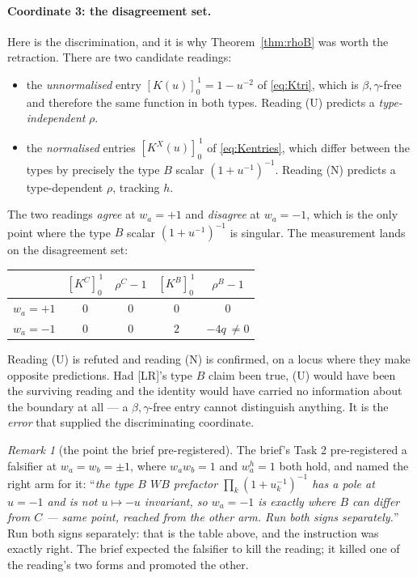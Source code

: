 \documentclass[11pt]{article}
\theoremstyle{plain}
\theoremstyle{definition}
\theoremstyle{remark}
\newtheorem{rem}[thm]{Remark}
\theoremstyle{plain}
\begin{document}
\paragraph{Coordinate 3: the disagreement set.}
Here is the discrimination, and it is why Theorem~\ref{thm:rhoB} was worth the
retraction.  There are two candidate readings:
\begin{itemize}
\item[(U)] the \emph{unnormalised} entry $[K(u)]_0^{\,1}=1-u^{-2}$ of
  \eqref{eq:Ktri}, which is $\beta,\gamma$-free and therefore the same function
  in both types.  Reading (U) predicts a \emph{type-independent} $\rho$.
\item[(N)] the \emph{normalised} entries $[K^X(u)]_0^{\,1}$ of
  \eqref{eq:Kentries}, which differ between the types by precisely the type $B$
  scalar $(1+u^{-1})^{-1}$.  Reading (N) predicts a type-dependent $\rho$,
  tracking $h$.
\end{itemize}
The two readings \emph{agree} at $w_a=+1$ and \emph{disagree} at $w_a=-1$,
which is the only point where the type $B$ scalar $(1+u^{-1})^{-1}$ is singular.
The measurement lands on the disagreement set:
\begin{center}
\begin{tabular}{@{}lcccc@{}}
\toprule
 & $[K^C]_0^{\,1}$ & $\rho^C-1$ & $[K^B]_0^{\,1}$ & $\rho^B-1$ \\
\midrule
$w_a=+1$ & $0$ & $0$ & $0$ & $0$ \\
$w_a=-1$ & $0$ & $0$ & $2$ & $-4q\ \neq0$ \\
\bottomrule
\end{tabular}
\end{center}
Reading (U) is refuted and reading (N) is confirmed, on a locus where they make
opposite predictions.  Had [LR]'s type $B$ claim been true, (U) would have been
the surviving reading and the identity would have carried no information about
the boundary at all --- a $\beta,\gamma$-free entry cannot distinguish anything.
It is the \emph{error} that supplied the discriminating coordinate.

\begin{rem}[the point the brief pre-registered]\label{rem:task2}
The brief's Task 2 pre-registered a falsifier at $w_a=w_b=\pm1$, where
$w_aw_b=1$ and $w_a^{h}=1$ both hold, and named the right arm for it:
``\emph{the type $B$ $WB$ prefactor $\prod_k(1+u_k^{-1})^{-1}$ has a pole at
$u=-1$ and is not $u\mapsto-u$ invariant, so $w_a=-1$ is exactly where $B$ can
differ from $C$ --- same point, reached from the other arm.  Run both signs
separately.}''  Run both signs separately: that is the table above, and the
instruction was exactly right.  The brief expected the falsifier to kill the
reading; it killed one of the reading's two forms and promoted the other.
\end{rem}
\end{document}

